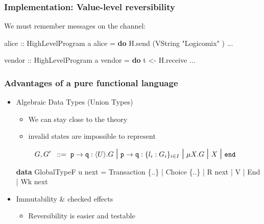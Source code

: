 \documentclass[12pt]{beamer}
\newenvironment{Shaded}{}{}
\newcommand{\KeywordTok}[1]{\textcolor[rgb]{0.00,0.44,0.13}{\textbf{#1}}}
\newcommand{\DataTypeTok}[1]{\textcolor[rgb]{0.56,0.13,0.00}{#1}}
\newcommand{\StringTok}[1]{\textcolor[rgb]{0.25,0.44,0.63}{#1}}
\newcommand{\OtherTok}[1]{\textcolor[rgb]{0.00,0.44,0.13}{#1}}
\newcommand{\FunctionTok}[1]{\textcolor[rgb]{0.02,0.16,0.49}{#1}}
\newcommand{\NormalTok}[1]{#1}
\begin{document}
\begin{frame}[fragile]
\frametitle{Implementation: Value-level reversibility}

We must remember messages on the channel:

\begin{Shaded}
\begin{Highlighting}[]
\OtherTok{alice ::} \DataTypeTok{HighLevelProgram}\NormalTok{ a}
\NormalTok{alice }\FunctionTok{=} \KeywordTok{do}
\NormalTok{    H.send (}\DataTypeTok{VString} \StringTok{"Logicomix"}\NormalTok{ )}
    \FunctionTok{...}

\OtherTok{vendor ::} \DataTypeTok{HighLevelProgram}\NormalTok{ a}
\NormalTok{vendor }\FunctionTok{=} \KeywordTok{do}
\NormalTok{    t }\OtherTok{<-}\NormalTok{ H.receive}
    \FunctionTok{...}
\end{Highlighting}
\end{Shaded}

\end{frame}

\begin{frame}[fragile]
\frametitle{Advantages of a pure functional language}


\begin{itemize}
    \item Algebraic Data Types (Union Types) 
        \begin{itemize}
            \item         We can stay close to the theory 
            \item         invalid states are impossible to represent
        \end{itemize} \footnotesize
\begin{align*}
    G, G'  \bnfis & \gtcom{p}{q}{U}{G} %
    \sbnfbar
    \gtcho{p}{q}{\lbl_i}{G_i} %
    \sbnfbar %
    \mu X. G \sbnfbar X \sbnfbar \gend 
\end{align*}
\normalsize

\begin{Shaded}
\begin{Highlighting}[]
\KeywordTok{data} \DataTypeTok{GlobalTypeF}\NormalTok{ u next }\FunctionTok{=} 
    \DataTypeTok{Transaction}\NormalTok{ \{}\FunctionTok{..}\NormalTok{\} }\FunctionTok{|} \DataTypeTok{Choice}\NormalTok{ \{}\FunctionTok{..}\NormalTok{\}  }\FunctionTok{|} \DataTypeTok{R}\NormalTok{ next }\FunctionTok{|} \DataTypeTok{V} \FunctionTok{|} \DataTypeTok{End} \FunctionTok{|} \DataTypeTok{Wk}\NormalTok{ next}
\end{Highlighting}
\end{Shaded}


        \vspace*{0.2cm}
    \item Immutability \& checked effects  
        \begin{itemize}
            \item Reversibility is easier and testable 
        \end{itemize}

\end{itemize}

\end{frame}
\end{document}
